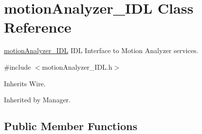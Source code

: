 \section{motion\+Analyzer\+\_\+\+I\+DL Class Reference}
\label{classmotionAnalyzer__IDL}


\mbox{\hyperlink{classmotionAnalyzer__IDL}{motion\+Analyzer\+\_\+\+I\+DL}} I\+DL Interface to Motion Analyzer services.  




{\ttfamily \#include $<$motion\+Analyzer\+\_\+\+I\+D\+L.\+h$>$}



Inherits Wire.



Inherited by Manager.

\subsection*{Public Member Functions}
